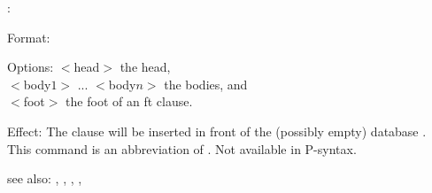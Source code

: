 \aNullft:

Format: 

Options: $<$head$>$ the head,\\
	 $<$body$1>$ ... $<$body$n>$ the bodies, and\\
	 $<$foot$>$ the foot of an ft clause.

Effect: The clause 
        will be inserted in front 
	of the (possibly empty) database .
	This command is an abbreviation of 
        .
        Not available in P-syntax.

see also: \aNull, \aNullhn, \consult, \destroy, \replace
